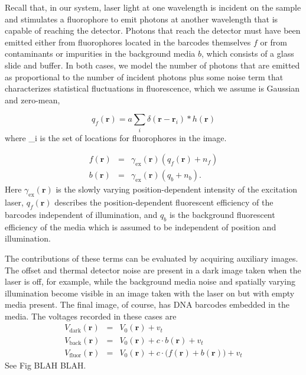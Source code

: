 Recall that, in our system, laser light at one wavelength is incident on the sample and stimulates a fluorophore to emit photons at another wavelength that is capable of reaching the detector. Photons that reach the detector must have been emitted either from fluorophores located  in the barcodes themselves $f$ or from contaminants or impurities in the background media $b$, which consists of a glass slide and buffer.  In both cases, we model the number of photons that are emitted as proportional to the number of incident photons plus some noise term that characterizes statistical fluctuations in fluorescence, which we assume is Gaussian and zero-mean, 

\begin{equation}
q_f(\mathbf{r})=a \sum_i\delta(\mathbf{r}-\mathbf{r}_i) * h(\mathbf{r})
\end{equation}
where _i is the set of locations for fluorophores in the image.


\begin{eqnarray}
f(\mathbf{r})&=&\gamma_{\text{ex}}(\mathbf{r}) ( q_f(\mathbf{r}) + n_f )\\
b(\mathbf{r})&=&\gamma_{\text{ex}}(\mathbf{r}) ( q_b + n_b ).
\end{eqnarray}
Here $\gamma_{\text{ex}}(\mathbf{r})$ is the slowly varying position-dependent intensity of the excitation laser,  $q_f(\mathbf{r})$ describes the position-dependent fluorescent efficiency of the barcodes independent of illumination, and $q_b$ is the background fluorescent efficiency of the media which is assumed to be independent of position and illumination. 

The contributions of these terms can be evaluated by acquiring auxiliary images. The offset and thermal detector noise are present in a dark image taken when the laser is off, for example, while the background media noise and spatially varying illumination become visible in an image taken with the laser on but with empty media present. The final image, of course, has DNA barcodes embedded in the media. The voltages recorded in these cases are
\begin{eqnarray}
V_{\text{dark}}(\mathbf{r})&=&V_0(\mathbf{r})+v_t\\
V_{\text{back}}(\mathbf{r})&=&V_0(\mathbf{r})+c \cdot  b(\mathbf{r})  +v_t\\
V_{\text{fluor}}(\mathbf{r})&=&V_0(\mathbf{r})+c \cdot \big( f(\mathbf{r}) + b(\mathbf{r})\big)  +v_t
\end{eqnarray}
See Fig BLAH BLAH. 

